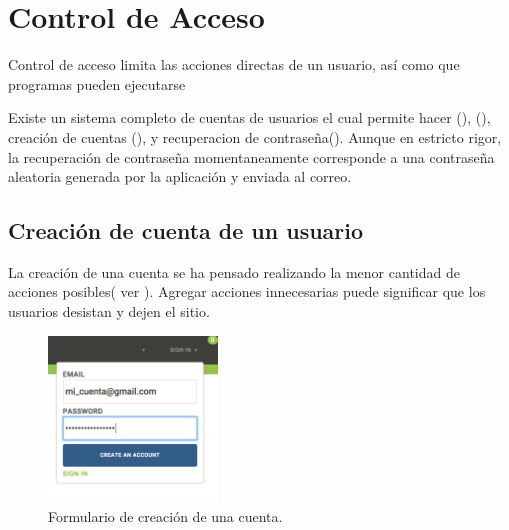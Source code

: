 \section{Control de Acceso}

Control de acceso limita las acciones directas de un usuario, así como que programas pueden ejecutarse \cite{sandhu1994access}
 
Existe un sistema completo de cuentas de usuarios el cual permite hacer \loginCPT(), \logoutCPT(), creación de cuentas (), y recuperacion de contraseña(). Aunque en estricto rigor, la recuperación de contraseña momentaneamente corresponde a una contraseña aleatoria generada por la aplicación y enviada al correo.


\subsection{Creación de cuenta de un usuario}

La creación de una cuenta se ha pensado realizando la menor cantidad de acciones posibles( ver ). Agregar acciones innecesarias puede significar que los usuarios desistan y dejen el sitio\cite{online_goodgui_org}.

\begin{figure}[H]
	\centering
	\includegraphics[width=0.4\textwidth]{figuras/architecture/accounts/new/form.png}

	\caption{Formulario de creación de una cuenta.}
	\label{figure:architecture:accounts:new:form}
\end{figure}


